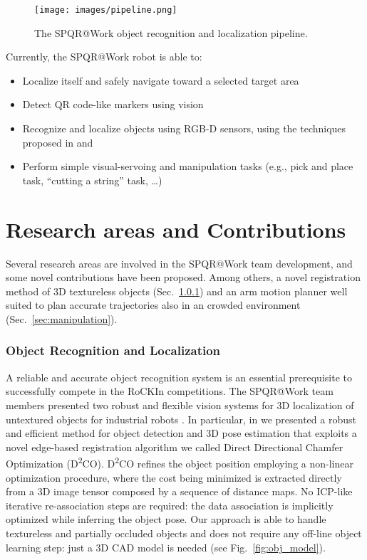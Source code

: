 \documentclass[conference]{IEEEtran}
\begin{document}
\begin{figure}[t!]
\begin{center}
\texttt{[image: images/pipeline.png]}
\end{center}
\caption{The SPQR@Work object recognition and localization pipeline.}\label{fig:pipeline}
\end{figure}

Currently, the SPQR@Work robot is able to:

\begin{itemize}
 \item Localize itself and safely navigate toward a selected target area
 \item Detect QR code-like markers using vision
 \item Recognize and localize objects using RGB-D sensors, using the techniques proposed in \cite{miap_icvs2015} and \cite{prettoCASE2013}
 \item Perform simple visual-servoing and manipulation tasks (e.g., pick and place task, ``cutting a string'' task, \dots)
\end{itemize}
 
\section{Research areas and Contributions}\label{sec:research}

Several research areas are involved in the SPQR@Work team development, and some novel contributions have been proposed. Among others, a novel registration method of 3D textureless objects (Sec.~\ref{sec:object_rec}) and an arm motion planner well suited to plan
accurate trajectories also in an crowded environment (Sec.~\ref{sec:manipulation}).


\subsubsection{Object Recognition and Localization}\label{sec:object_rec}

A reliable and accurate object recognition system is an essential prerequisite to successfully compete in the RoCKIn competitions. The SPQR@Work team members presented two robust and flexible vision systems for 3D localization of untextured objects for industrial robots \cite{miap_icvs2015, prettoCASE2013}. In particular, in \cite{miap_icvs2015} we presented a robust and efficient method for object detection and 3D pose estimation that exploits a novel edge-based registration algorithm we called Direct Directional Chamfer Optimization (D\textsuperscript{2}CO). D\textsuperscript{2}CO refines the object position employing a non-linear optimization procedure, where the cost being minimized is extracted directly from a 3D image tensor composed by a sequence of distance maps. No ICP-like iterative re-association steps are required: the data association is implicitly optimized while inferring the object pose. Our approach is able to handle textureless and partially occluded objects and does not require any off-line object learning step: just a 3D CAD model is needed (see Fig.~\ref{fig:obj_model}).
\end{document}
